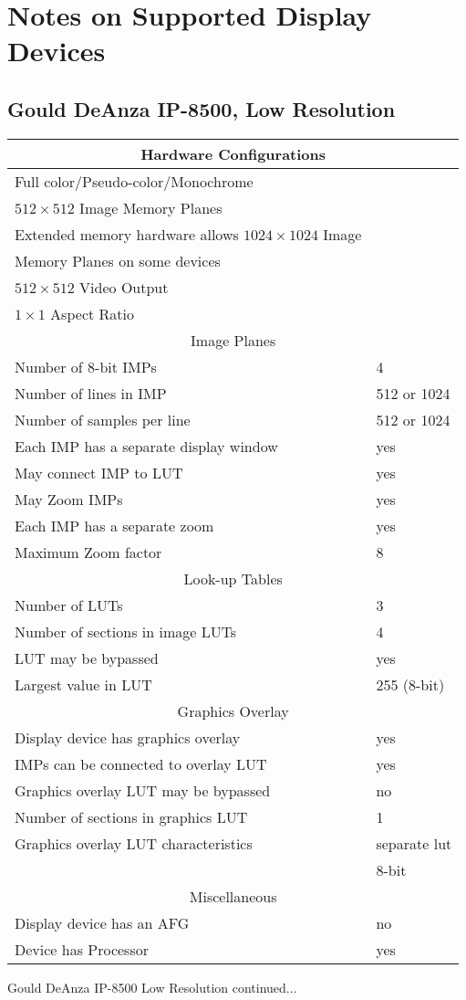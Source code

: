 \section{Notes on Supported Display Devices}
\subsection{Gould DeAnza IP-8500, Low Resolution}
\begin{tabular}{|l l|}
\hline
\multicolumn{2}{|c|}{Hardware Configurations}\\
\hline
Full color/Pseudo-color/Monochrome & \\
$512 \times 512$ Image Memory Planes & \\
Extended memory hardware allows $1024 \times 1024$ Image & \\
     Memory Planes on some devices & \\
$512 \times 512$ Video Output & \\
$1 \times 1$ Aspect Ratio & \\ 
\hline \hline 
\multicolumn{2}{|c|}{Image Planes}\\ \hline
Number of 8-bit IMPs & 4 \\
Number of lines in IMP & 512 or 1024\\
Number of samples per line & 512 or 1024\\
Each IMP has a separate display window & yes\\
May connect IMP to LUT & yes\\
May Zoom IMPs & yes\\
Each IMP has a separate zoom & yes\\
Maximum Zoom factor & 8\\
\hline \hline 
\multicolumn{2}{|c|}{Look-up Tables}\\ 
\hline
Number of LUTs & 3\\
Number of sections in image LUTs & 4\\
LUT may be bypassed & yes\\
Largest value in LUT & 255 (8-bit)\\
\hline \hline 
\multicolumn{2}{|c|}{Graphics Overlay}\\ 
\hline
Display device has graphics overlay & yes\\
IMPs can be connected to overlay LUT & yes\\
Graphics overlay LUT may be bypassed & no\\
Number of sections in graphics LUT & 1\\
Graphics overlay LUT characteristics & separate lut\\
& 8-bit\\
\hline \hline 
\multicolumn{2}{|c|}{Miscellaneous}\\ 
\hline
Display device has an AFG & no \\
Device has Processor & yes\\ \hline
\end{tabular}
\newpage
Gould DeAnza IP-8500 Low Resolution continued...


